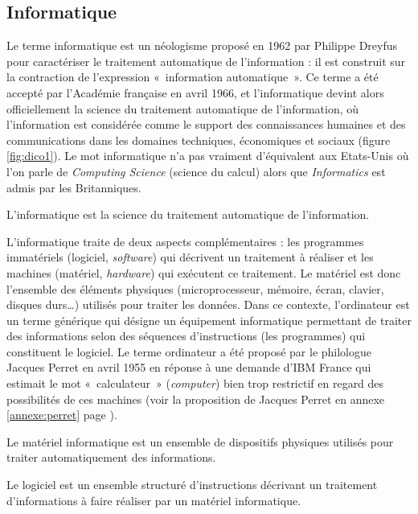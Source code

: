 \subsection{Informatique}
Le terme {\sc informatique} est un néologisme proposé en 1962 par
Philippe Dreyfus pour caractériser le traitement automatique de l'information :
il est construit sur la contraction de l'expression  «~information automatique~».
Ce terme a été accepté par l'Académie française en avril 1966, et l'informatique devint alors
officiellement la science du traitement automatique de l'information, où l'information
est considérée comme le support des connaissances humaines et des communications 
dans les domaines techniques, économiques et sociaux (figure \ref{fig:dico1}).
Le mot {\sc informatique} n'a pas vraiment d'équivalent aux Etats-Unis où l'on parle de 
{\em Computing Science} (science du calcul) alors que {\em Informatics} est admis par les Britanniques. 

\begin{defin}[informatique]\label{def:informatique}
L'informatique est la science du traitement automatique de l'information.
\end{defin}

L'informatique traite de deux aspects complémentaires : les programmes immatériels (logiciel, {\em software})
qui décrivent un traitement à réaliser et les machines (matériel, {\em hardware}) 
qui exécutent ce traitement.
Le matériel est donc l'ensemble des éléments physiques (microprocesseur, mémoire, écran, clavier, disques durs\ldots)
utilisés pour traiter les données. 
Dans ce contexte, l'ordinateur est un terme générique qui désigne un équipement informatique permettant de traiter des 
informations selon des séquences d'instructions (les programmes) qui constituent le logiciel.
Le terme {\sc ordinateur} a été proposé par le philologue Jacques Perret en avril 1955 
en réponse à une demande d'IBM France qui estimait le mot «~calculateur~» ({\em computer}) 
bien trop restrictif en regard des possibilités de ces machines (voir la proposition de 
Jacques Perret en annexe \ref{annexe:perret} page \pageref{annexe:perret}).

\begin{defin}[matériel]\label{def:materiel}
Le matériel informatique est un ensemble de dispositifs physiques utilisés pour traiter
automatiquement des informations.
\end{defin}
\begin{defin}[logiciel]\label{def:logiciel}
Le logiciel est un ensemble structuré d'instructions décrivant un traitement d'informations
à faire réaliser par un matériel informatique.
\end{defin}

